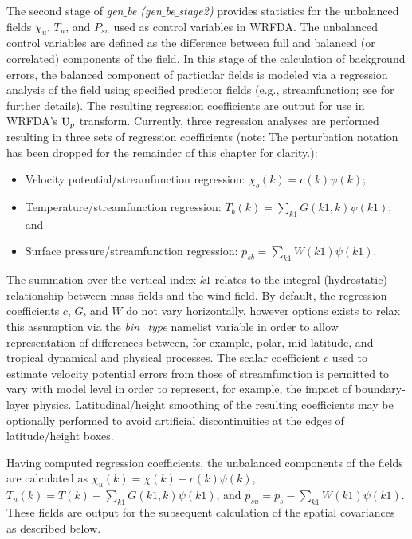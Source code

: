 The second stage
of {\it gen$\_$be (gen$\_$be$\_$stage2)} provides statistics for the
unbalanced fields $\chi_u$, $T_u$, and $P_{su}$ used as control
variables in WRFDA. The unbalanced control variables are defined as
the difference between full and balanced (or correlated) components of
the field. In this stage of the calculation of background errors, the
balanced component of particular fields is modeled via a regression
analysis of the field using specified predictor fields
(e.g., streamfunction; see
\citet{wu02} for further details). The resulting regression coefficients 
are output for use 
in WRFDA's ${\rm U}_p$ transform. Currently, three regression analyses are
performed resulting in three sets of regression coefficients (note:
The perturbation notation has been dropped for the 
remainder of this chapter for clarity.):

\begin{itemize}\setlength{\parskip}{-4pt}
\item   Velocity potential/streamfunction regression: $\chi_b(k)=c(k)\psi(k)$;
\item	Temperature/streamfunction regression: $T_b(k)=\sum_{k1}G(k1,k)\psi(k1)$; and
\item	Surface pressure/streamfunction regression: $p_{sb}=\sum_{k1}W(k1)\psi(k1)$.
\end{itemize}

The summation over the vertical index $k1$ relates to the integral (hydrostatic) relationship between
mass fields and the wind field. By default, the regression coefficients $c$, $G$, and $W$ do 
not vary horizontally, however options exists to relax this assumption via the {\it bin\_type} 
namelist variable in order to allow representation of differences between, for example, polar, mid-latitude, 
and tropical dynamical and physical processes. The scalar coefficient $c$ used to 
estimate velocity potential errors from those of streamfunction is permitted to vary with model
level in order to represent, for example, the impact of boundary-layer physics. Latitudinal/height 
smoothing of the resulting coefficients may be optionally performed to avoid artificial 
discontinuities at the edges of latitude/height boxes.

Having computed regression coefficients, the unbalanced components of the fields are 
calculated as $\chi_{u}(k)=\chi(k)-c(k)\psi(k)$, $T_{u}(k)=T(k)-\sum_{k1}G(k1,k)\psi(k1)$, 
and $p_{su}=p_s - \sum_{k1} W(k1)\psi(k1)$. These fields are output for the 
subsequent calculation of the spatial covariances as described below.

